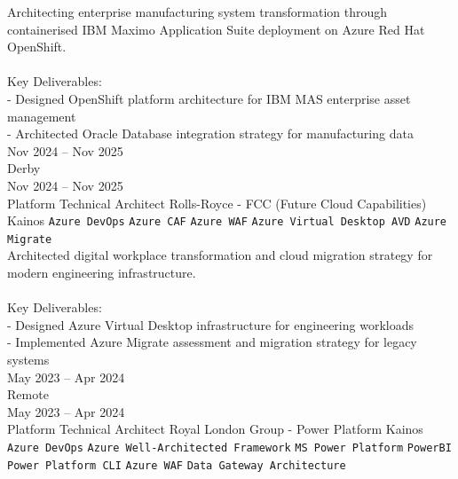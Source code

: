 \documentclass[9pt]{style/developercv}
\begin{document}
\begin{entrylist}
{      Architecting enterprise manufacturing system transformation through containerised IBM Maximo Application Suite deployment on Azure Red Hat OpenShift.\\
      \\
      Key Deliverables:\\
      - Designed OpenShift platform architecture for IBM MAS enterprise asset management\\
      - Architected Oracle Database integration strategy for manufacturing data\\
        }
    \entry
    {Nov 2024 -- Nov 2025\\\footnotesize{Derby}
    \\Nov 2024  -- Nov 2025\\\footnotesize{Platform Technical Architect}}
        {Rolls-Royce - FCC (Future Cloud Capabilities)}
        {Kainos}
        {
      \texttt{Azure DevOps}\slashsep
      \texttt{Azure CAF}\slashsep
      \texttt{Azure WAF}\slashsep
      \texttt{Azure Virtual Desktop AVD}\slashsep
      \texttt{Azure Migrate}\\

      Architected digital workplace transformation and cloud migration strategy for modern engineering infrastructure.\\
      \\
      Key Deliverables:\\
      - Designed Azure Virtual Desktop infrastructure for engineering workloads\\
      - Implemented Azure Migrate assessment and migration strategy for legacy systems\\
        }
    \entry
    {May 2023  -- Apr 2024\\\footnotesize{Remote}
    \\May 2023  -- Apr 2024\\\footnotesize{Platform Technical Architect}}
    {Royal London Group - Power Platform}
    {Kainos}
    {
      \texttt{Azure DevOps}\slashsep
      \texttt{Azure Well-Architected Framework}\slashsep
      \texttt{MS Power Platform}\slashsep
      \texttt{PowerBI}\slashsep
      \texttt{Power Platform CLI}\slashsep
      \texttt{Azure WAF}\slashsep
      \texttt{Data Gateway Architecture}\\

}
\end{entrylist}
\end{document}
